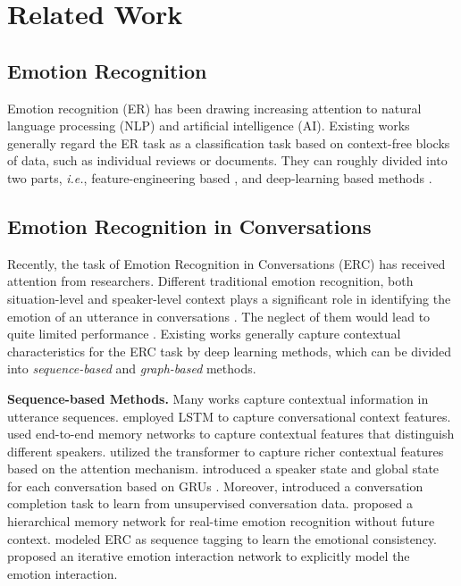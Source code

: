 \documentclass[11pt,a4paper]{article}
\begin{document}
\section{Related Work}



\subsection{Emotion Recognition}
Emotion recognition (ER) has been drawing increasing attention to natural language processing (NLP) and artificial intelligence (AI).
Existing works generally regard the ER task as a classification task based on context-free blocks of data, such as individual reviews or documents.  
They can roughly divided into two parts, \textit{i.e.}, feature-engineering based \cite{DBLP:conf/interspeech/DevillersV06},  and deep-learning based methods 
\cite{DBLP:conf/coling/TangQFL16,wei2020hierarchical}.




\subsection{Emotion Recognition in Conversations}
Recently, the task of Emotion Recognition in Conversations (ERC) has received attention from researchers.
Different traditional emotion recognition, both situation-level and speaker-level context plays a significant role in identifying the emotion of an utterance in conversations \cite{DBLP:conf/coling/LiJLZL20}.
The neglect of them would lead to quite limited performance \cite{DBLP:conf/emnlp/BerteroSWWCF16}.
Existing works generally capture contextual characteristics for the ERC task by deep learning methods, which can be divided into {\it sequence-based} and {\it graph-based} methods.


\textbf{Sequence-based Methods.}
Many works capture contextual information in utterance sequences. 
\citet{DBLP:conf/acl/PoriaCHMZM17} employed LSTM \cite{DBLP:journals/neco/HochreiterS97} to capture conversational context features.
\citet{DBLP:conf/emnlp/HazarikaPMCZ18,DBLP:conf/naacl/HazarikaPZCMZ18} used end-to-end memory networks \cite{DBLP:conf/nips/SukhbaatarSWF15} to capture contextual features that distinguish different speakers.
\citet{DBLP:conf/emnlp/ZhongWM19,DBLP:conf/coling/LiJLZL20} utilized the transformer \cite{DBLP:conf/nips/VaswaniSPUJGKP17} to capture richer contextual features based on the attention mechanism.
\citet{DBLP:conf/aaai/MajumderPHMGC19} introduced a speaker state and global state for each conversation based on GRUs \cite{DBLP:conf/emnlp/ChoMGBBSB14}.
Moreover, 
\citet{DBLP:conf/emnlp/JiaoLK20} introduced a conversation completion task to learn from unsupervised conversation data.
\citet{DBLP:conf/aaai/JiaoLK20} proposed a hierarchical memory network for real-time emotion recognition without future context.
\citet{DBLP:conf/sigdial/WangZMWX20} modeled ERC as sequence tagging to learn the emotional consistency.
\citet{DBLP:conf/coling/LuZWTCQ20} proposed an iterative emotion interaction network to explicitly model the emotion interaction.
\end{document}
